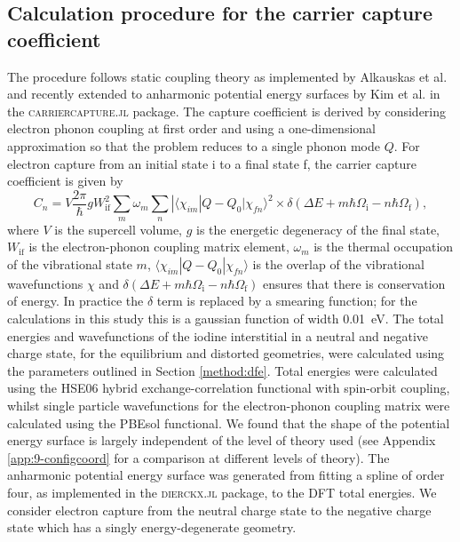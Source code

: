 \subsection{Calculation procedure for the carrier capture coefficient}

The procedure follows static coupling theory as implemented by Alkauskas et al.\autocite{Alkauskas2014} and recently extended to anharmonic potential energy surfaces by Kim et al. in the \textsc{carriercapture.jl} package.\autocite{carriercapture,Kim2019}
The capture coefficient is derived by considering electron phonon coupling at first order and using a one-dimensional approximation so that the problem reduces to a single phonon mode $Q$. For electron capture from an initial state i to a final state f, the carrier capture coefficient is given by
\begin{equation} \label{carriercapteqn}
    C_n = V\frac{2\pi}{\hbar}gW_\textrm{if}^2\sum_m\omega_m\sum_n|\langle\chi_{im}|Q-Q_0|\chi_{fn}\rangle^2\times \delta(\Delta E+m\hbar\Omega_\textrm{i}-n\hbar\Omega_\textrm{f}),
\end{equation}
where $V$ is the supercell volume, $g$ is the energetic degeneracy of the final state, $W_\textrm{if}$ is the electron-phonon coupling matrix element, $\omega_m$ is the thermal occupation of the vibrational state $m$, $\langle\chi_{im}|Q-Q_0|\chi_{fn}\rangle$ is the overlap of the vibrational wavefunctions $\chi$ and $\delta(\Delta E+m\hbar\Omega_\textrm{i}-n\hbar\Omega_\textrm{f})$ ensures that there is conservation of energy. In practice the $\delta$ term is replaced by a smearing function; for the calculations in this study this is a gaussian function of width \SI{0.01}{\electronvolt}.
The total energies and wavefunctions of the iodine interstitial in a neutral and negative charge state, for the equilibrium and distorted geometries, were calculated using the parameters outlined in Section \ref{method:dfe}. Total energies were calculated using the HSE06 hybrid exchange-correlation functional with spin-orbit coupling, whilst single particle wavefunctions for the electron-phonon coupling matrix were calculated using the PBEsol functional.
We found that the shape of the potential energy surface is largely independent of the level of theory used (see Appendix \ref{app:9-configcoord} for a comparison at different levels of theory).
The anharmonic potential energy surface was generated from fitting a spline of order four, as implemented in the \textsc{dierckx.jl} package,\autocite{dierckx} to the DFT total energies. 
We consider electron capture from the neutral charge state to the negative charge state which has a singly energy-degenerate geometry.

